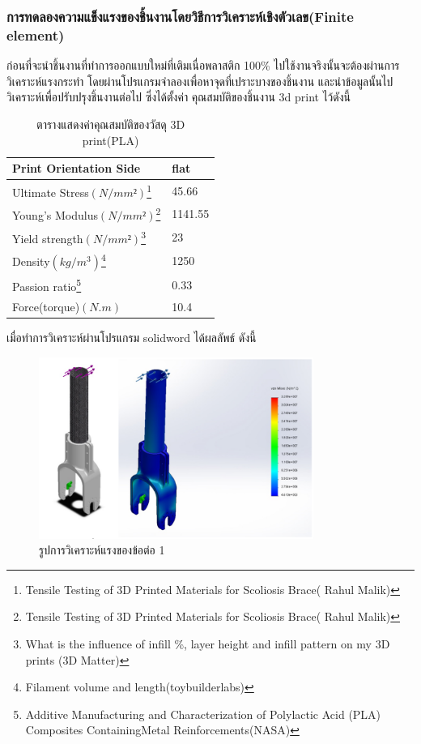 \subsubsection*{การทดลองความแข็งแรงของชิ้นงานโดยวิธีการวิเคราะห์เชิงตัวเลข(Finite element)}
ก่อนที่จะนำชิ้นงานที่ทำการออกแบบใหม่ที่เติมเนื่อพลาสติก 100\% ไปใช้งานจริงนั้นจะต้องผ่านการวิเคราะห์แรงกระทำ
โดยผ่านโปรแกรมจำลองเพื่อหาจุดที่เปราะบางของชิ้นงาน  และนำข้อมูลนั้นไปวิเคราะห์เพื่อปรับปรุงชิ้นงานต่อไป 
ซึ่งได้ตั้งค่า คุณสมบัติของชิ้นงาน 3d print ไว้ดังนี้ 
\begin{table}[ht]
	\centering
	\begin{tabular}{| l | l |}
		\hline
		Print Orientation Side	& flat \\
        \hline
        Ultimate Stress$(N/mm²)$\footnote{Tensile Testing of 3D Printed Materials for Scoliosis Brace( Rahul Malik)} & 	45.66 \\
        Young’s Modulus$(N/mm²)$\footnote{Tensile Testing of 3D Printed Materials for Scoliosis Brace( Rahul Malik)} & 	1141.55 \\
        Yield strength$(N/mm²)$\footnote{What is the influence of infill \%, layer height and infill pattern on my 3D prints (3D Matter)} & 23 \\
        Density$(kg/m^3)$\footnote{Filament volume and length(toybuilderlabs)} &	1250 \\
        Passion ratio\footnote{Additive Manufacturing and Characterization of Polylactic Acid (PLA) Composites ContainingMetal Reinforcements(NASA)} &	0.33 \\
        Force(torque)$(N.m)$ & 10.4 \\
	    \hline
	\end{tabular}
	\caption{ตารางแสดงค่าคุณสมบัติของวัสดุ 3D print(PLA)}
	\label{tab:PLA_property}
\end{table}

เมื่อทำการวิเคราะห์ผ่านโปรแกรม solidword ได้ผลลัพธ์ ดังนี้

\begin{figure}[h!]
  \centering
  \includegraphics[width=0.8\textwidth]{chapter4/images/FEA1.PNG}
  \caption{รูปการวิเคราะห์แรงของข้อต่อ 1}
  \label{fig:FEAjoint1}
\end{figure}

